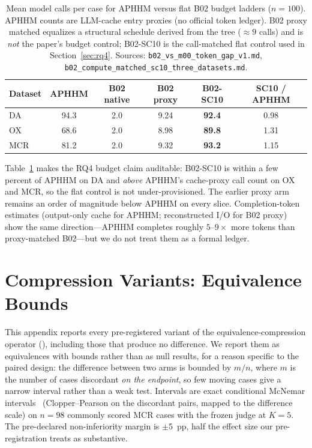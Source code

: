 \begin{table}[t]
\centering
\scriptsize
\caption{Mean model calls per case for APHHM versus flat B02 budget ladders ($n{=}100$). APHHM counts are LLM-cache entry proxies (no official token ledger). B02 proxy matched equalizes a structural schedule derived from the tree ($\approx9$ calls) and is \emph{not} the paper's budget control; B02-SC10 is the call-matched flat control used in Section~\ref{sec:rq4}. Sources: \texttt{b02\_vs\_m00\_token\_gap\_v1.md}, \texttt{b02\_compute\_matched\_sc10\_three\_datasets.md}.}
\label{tab:compute}
\begin{tabular}{lccccc}
\toprule
Dataset & APHHM & B02 native & B02 proxy & \textbf{B02-SC10} & SC10 / APHHM \\
\midrule
DA & 94.3 & 2.0 & 9.24 & \textbf{92.4} & 0.98 \\
OX & 68.6 & 2.0 & 8.98 & \textbf{89.8} & 1.31 \\
MCR & 81.2 & 2.0 & 9.32 & \textbf{93.2} & 1.15 \\
\bottomrule
\end{tabular}
\end{table}

\noindent
Table~\ref{tab:compute} makes the RQ4 budget claim auditable: B02-SC10 is within a few percent of APHHM on DA and \emph{above} APHHM's cache-proxy call count on OX and MCR, so the flat control is not under-provisioned.
The earlier proxy arm remains an order of magnitude below APHHM on every slice.
Completion-token estimates (output-only cache for APHHM; reconstructed I/O for B02 proxy) show the same direction---APHHM completes roughly $5$--$9\times$ more tokens than proxy-matched B02---but we do not treat them as a formal ledger.

\section{Compression Variants: Equivalence Bounds}
\label{app:eq-equiv}

This appendix reports every pre-registered variant of the equivalence-compression operator (), including those that produce no difference.
We report them as equivalences with bounds rather than as null results, for a reason specific to the paired design: the difference between two arms is bounded by $m/n$, where $m$ is the number of cases discordant \emph{on the endpoint}, so few moving cases give a narrow interval rather than a weak test.
Intervals are exact conditional McNemar intervals~\cite{mcnemar1947} (Clopper--Pearson on the discordant pairs, mapped to the difference scale) on $n=98$ commonly scored MCR cases with the frozen judge at $K{=}5$.
The pre-declared non-inferiority margin is $\pm 5$~pp, half the effect size our pre-registration treats as substantive.

